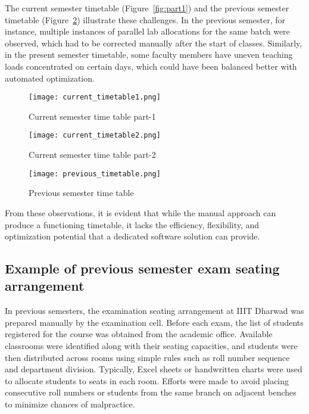 \documentclass[12pt]{article}
\begin{document}
The current semester timetable (Figure~\ref{fig:part1}) and the previous semester timetable (Figure~\ref{fig:placeholder}) illustrate these challenges. In the previous semester, for instance, multiple instances of parallel lab allocations for the same batch were observed, which had to be corrected manually after the start of classes. Similarly, in the present semester timetable, some faculty members have uneven teaching loads concentrated on certain days, which could have been balanced better with automated optimization.
\begin{figure}[h!]
    \centering
    \begin{minipage}{0.48\linewidth}
        \centering
        \texttt{[image: current\_timetable1.png]}
        \caption{Current semester time table part-1}
        \label{fig:part1}
    \end{minipage}\hfill
    \begin{minipage}{0.48\linewidth}
        \centering
        \texttt{[image: current\_timetable2.png]}
        \caption{Current semester time table part-2}
        \label{fig:part2}
    \end{minipage}
\end{figure}

\begin{figure}
    \centering
    \texttt{[image: previous\_timetable.png]}
    \caption{Previous semester time table}
    \label{fig:placeholder}
\end{figure}

From these observations, it is evident that while the manual approach can produce a functioning timetable, it lacks the efficiency, flexibility, and optimization potential that a dedicated software solution can provide.
\subsection{Example of previous semester exam seating arrangement}
In previous semesters, the examination seating arrangement at IIIT Dharwad was prepared manually by the examination cell. Before each exam, the list of students registered for the course was obtained from the academic office. Available classrooms were identified along with their seating capacities, and students were then distributed across rooms using simple rules such as roll number sequence and department division. Typically, Excel sheets or handwritten charts were used to allocate students to seats in each room. Efforts were made to avoid placing consecutive roll numbers or students from the same branch on adjacent benches to minimize chances of malpractice.
\end{document}
